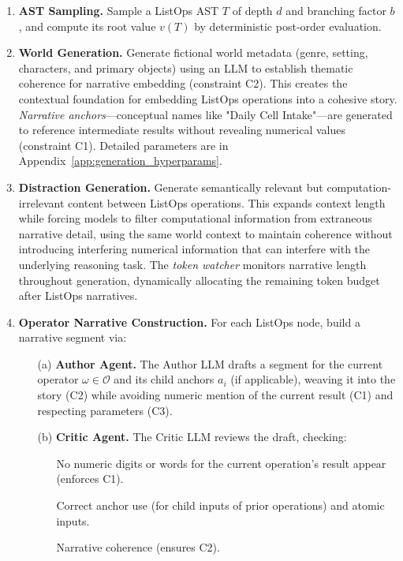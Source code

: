 \documentclass{article}
\begin{document}
\begin{enumerate}
  \item \textbf{AST Sampling.} Sample a ListOps AST $T$ of depth $d$ and branching factor $b$, and compute its root value $v(T)$ by deterministic post‐order evaluation.
  \item \textbf{World Generation.} Generate fictional world metadata (genre, setting, characters, and primary objects) using an LLM to establish thematic coherence for narrative embedding (constraint C2). This creates the contextual foundation for embedding ListOps operations into a cohesive story. \emph{Narrative anchors}—conceptual names like "Daily Cell Intake"—are generated to reference intermediate results without revealing numerical values (constraint C1). Detailed parameters are in Appendix~\ref{app:generation_hyperparams}.
  \item \textbf{Distraction Generation.} Generate semantically relevant but computation-irrelevant content between ListOps operations. This expands context length while forcing models to filter computational information from extraneous narrative detail, using the same world context to maintain coherence without introducing interfering numerical information that can interfere with the underlying reasoning task. The \emph{token watcher} monitors narrative length throughout generation, dynamically allocating the remaining token budget after ListOps narratives.
  \item \textbf{Operator Narrative Construction.} For each ListOps node, build a narrative segment via:
        \begin{itemize}
          \item[(a)] \textbf{Author Agent.} The Author LLM drafts a segment for the current operator $\omega \in \mathcal{O}$ and its child anchors $a_i$ (if applicable), weaving it into the story (C2) while avoiding numeric mention of the current result (C1) and respecting parameters (C3).
          \item[(b)] \textbf{Critic Agent.} The Critic LLM reviews the draft, checking:
                \begin{itemize}
                  \item[\textbullet] No numeric digits or words for the current operation's result appear (enforces C1).
                  \item[\textbullet] Correct anchor use (for child inputs of prior operations) and atomic inputs.
                  \item[\textbullet] Narrative coherence (ensures C2).

\end{itemize}
\end{itemize}
\end{enumerate}
\end{document}
